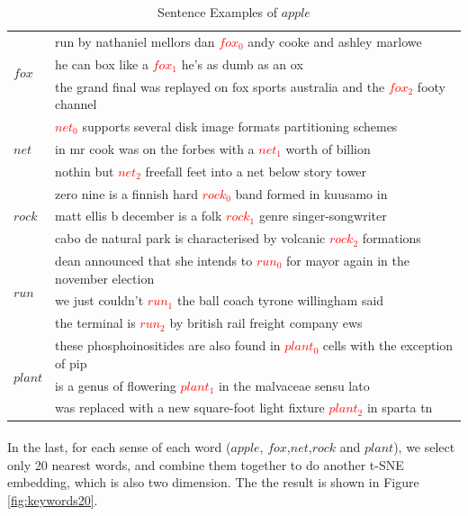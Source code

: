 \begin{table}
\begin{center} 
\begin{tabular}{|l|l|}
\hline
\multirow{3}{*}{$fox$} 
&run by nathaniel mellors dan \textcolor{red}{$fox_0$} andy cooke and ashley marlowe\\
&he can box like a \textcolor{red}{$fox_1$} he's as dumb as an ox\\
&the grand final was replayed on fox sports australia and the \textcolor{red}{$fox_2$} footy channel\\
\hline
\multirow{3}{*}{$net$} 
&\textcolor{red}{$net_0$} supports several disk image formats partitioning schemes\\
&in mr cook was on the forbes with a \textcolor{red}{$net_1$} worth of billion \\
&nothin but \textcolor{red}{$net_2$} freefall feet into a net below story tower\\
\hline
\multirow{3}{*}{$rock$} 
&zero nine is a finnish hard \textcolor{red}{$rock_0$} band formed in kuusamo in\\
&matt ellis b december is a folk \textcolor{red}{$rock_1$} genre singer-songwriter\\
&cabo de natural park is characterised by volcanic \textcolor{red}{$rock_2$} formations\\
\hline
\multirow{3}{*}{$run$} 
&dean announced that she intends to \textcolor{red}{$run_0$} for mayor again in the november election\\
& we just couldn't \textcolor{red}{$run_1$} the ball coach tyrone willingham said\\
& the terminal is \textcolor{red}{$run_2$} by british rail freight company ews\\
\hline
\multirow{3}{*}{$plant$} 
&these phosphoinositides are also found in \textcolor{red}{$plant_0$} cells with the exception of pip\\
&is a genus of flowering \textcolor{red}{$plant_1$} in the malvaceae sensu lato\\
&was replaced with a new square-foot light fixture \textcolor{red}{$plant_2$} in sparta tn\\
\hline
\end{tabular} 
\caption{Sentence Examples of $apple$} \label{tab:sentenceapple} 
\end{center}
\end{table}


\paragraph{} In the last, for each sense of each word ($apple$, $fox$,$net$,$rock$ and $plant$), we select only 20 nearest words, and combine them together to do another t-SNE embedding, which is also two dimension. The the result is shown in Figure \ref{fig:keywords20}. 

